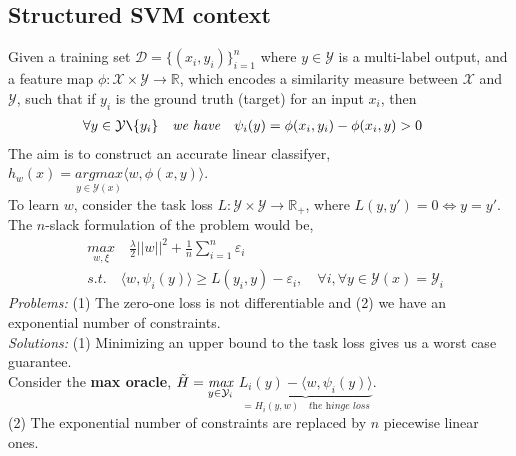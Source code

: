 \subsection{Structured SVM context}
Given a training set $\mathcal{D}=\{(x_i,y_i)\}_{i=1}^n$ where $y \in
\mathcal{Y}$ is a multi-label output, and a feature map
$\phi:\mathcal{X}\times\mathcal{Y}\longrightarrow \mathbb{R}$, which encodes a
similarity measure between $\mathcal{X}$ and $\mathcal{Y}$, such that if $y_{i}$
is the ground truth (target) for an input $x_{i}$, then
\begin{equation*}
\begin{aligned}
    &\forall y\in\mathcal{Y}\texttt{\symbol{92}}\{y_{i}\}\quad\textit{we
have}\quad \psi_{i}(y) = \phi(x_{i},y_{i})- \phi(x_{i},y) > 0
\end{aligned}
\end{equation*}
The aim is to construct an accurate linear classifyer, $h_{w}(x)=
\underset{y\in\mathcal{Y}(x)}{\textit{argmax}}\langle w, \phi(x,y)\rangle$.\\ To
learn $w$, consider the task loss
$L:\mathcal{Y}\times\mathcal{Y}\longrightarrow\mathbb{R}_{+}$, where
$L(y,y\prime)= 0 \Longleftrightarrow y= y\prime$. \\

The $n$-slack formulation of the problem would be,
\begin{equation*}
\begin{aligned}
    &\underset{w,\xi}{\textit{max}}\quad\frac{\lambda}{2}||w||^{2}+ \frac{1}{n}\sum_{i=1}^{n}\varepsilon_{i}\\
    &\textit{s.t.}\quad \langle w, \psi_{i}(y)\rangle \geq L(y_{i},y)-
\varepsilon_{i},\quad\forall i ,\forall y\in\mathcal{Y}(x)=\mathcal{Y}_{i}
\end{aligned}
\end{equation*}
\textit{Problems:} (1) The zero-one loss is not differentiable and (2) we have
an exponential number of constraints.\\ \textit{Solutions:} (1) Minimizing an
upper bound to the task loss gives us a worst case guarantee.\\


Consider the \textbf{max oracle}, $\Tilde{H}=
\underset{y\in\mathcal{Y}_{i}}{\textit{max}}$ $\underbrace{L_{i}(y)- \langle w,
\psi_{i}(y)\rangle}_{= H_{i}(y,w)\quad\textit{the hinge loss}}$.\\ (2) The
exponential number of constraints are replaced by $n$ piecewise linear ones. \\

